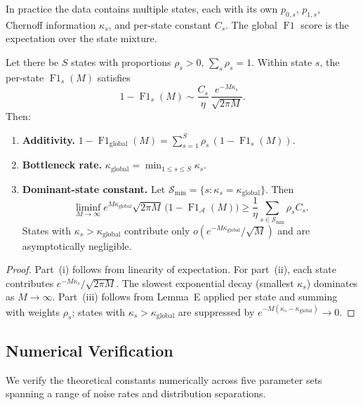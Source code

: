 In practice the data contains multiple states, each with its own
$p_{0,s}$, $p_{1,s}$, Chernoff information $\kappa_s$, and per-state
constant $C_s$.  The global $\operatorname{F1}$ score is the expectation
over the state mixture.

\begin{lemma}
  \label{lem:aggregation}
  Let there be $S$ states with proportions $\rho_s>0$, $\sum_s\rho_s=1$.
  Within state $s$, the per-state $\operatorname{F1}_s(M)$ satisfies
  \[
  1-\operatorname{F1}_s(M)
  \sim \frac{C_s}{\eta}\,
       \frac{e^{-M\kappa_s}}{\sqrt{2\pi M}}.
  \]
  Then:
  \begin{enumerate}[label=(\roman*)]
    \item \textbf{Additivity.}
      $\displaystyle
      1-\operatorname{F1}_{\text{global}}(M)
      = \sum_{s=1}^S \rho_s\,(1-\operatorname{F1}_s(M))$.
    \item \textbf{Bottleneck rate.}
      $\displaystyle
      \kappa_{\text{global}} = \min_{1\le s\le S} \kappa_s$.
    \item \textbf{Dominant-state constant.}
      Let $\mathcal{S}_{\min}=\{s:\kappa_s=\kappa_{\text{global}}\}$.  Then
      \[
      \liminf_{M\to\infty}
        e^{M\kappa_{\text{global}}}\sqrt{2\pi M}\,
        \bigl(1-\operatorname{F1}_{\mathcal{A}}(M)\bigr)
      \ge \frac1\eta\sum_{s\in\mathcal{S}_{\min}} \rho_s C_s.
      \]
      States with $\kappa_s>\kappa_{\text{global}}$ contribute only
      $o(e^{-M\kappa_{\text{global}}}/\sqrt{M})$ and are asymptotically
      negligible.
  \end{enumerate}
\end{lemma}

\begin{proof}
  Part~(i) follows from linearity of expectation.  For part~(ii), each state
  contributes $e^{-M\kappa_s}/\sqrt{2\pi M}$.  The slowest exponential decay
  (smallest $\kappa_s$) dominates as $M\to\infty$.  Part~(iii) follows from
  Lemma~E applied per state and summing with weights $\rho_s$; states with
  $\kappa_s>\kappa_{\text{global}}$ are suppressed by
  $e^{-M(\kappa_s-\kappa_{\text{global}})}\to0$.
\end{proof}

\subsection{Numerical Verification}
\label{sec:thm4_numerical}

We verify the theoretical constants numerically across five parameter sets
spanning a range of noise rates and distribution separations.

